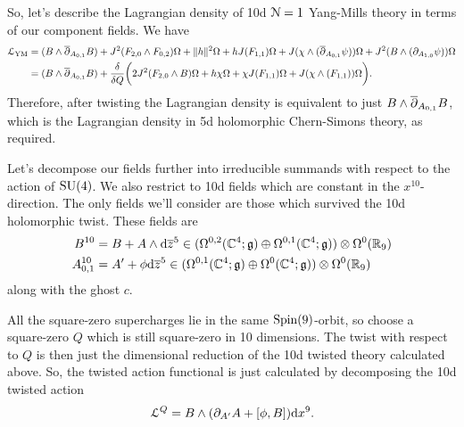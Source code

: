 \documentclass[10pt, oneside]{article}
\renewcommand{\d}{\mathrm{d}}
\begin{document}
\begin{example}[10d $\mc N=1$ Super Yang-Mills]
So, let's describe the Lagrangian density of 10d $\mc N=1$ Yang-Mills theory in terms of our component fields.  We have
\begin{align*}
\mathcal{L}_{\mathrm{YM}} &= (B \wedge \overline{\partial}_{A_{0,1}} B) + J^2(F_{2, 0}\wedge F_{0,2})\Omega + \|h\|^2\Omega + h J(F_{1,1}) \Omega + J( \chi \wedge (\overline{\partial}_{A_{0,1}} \psi)) \Omega + J^2(B \wedge (\partial_{A_{1,0}} \psi)) \Omega \\
&= (B \wedge \overline{\partial}_{A_{0,1}} B) + \frac\delta{\delta Q}\bigg( 2J^2(F_{2, 0}\wedge B)\Omega + h\chi\Omega + \chi J(F_{1,1}) \Omega + J( \chi \wedge (F_{1,1})) \Omega\bigg).
\end{align*}
Therefore, after twisting the Lagrangian density is equivalent to just $B \wedge \overline{\partial}_{A_{0,1}} B$, which is the Lagrangian density in 5d holomorphic Chern-Simons theory, as required.
\end{example}

\begin{example}[9d $\mc N=1$ Super Yang-Mills]
Let's decompose our fields further into irreducible summands with respect to the action of $\mathrm{SU}(4)$.  We also restrict to 10d fields which are constant in the $x^{10}$-direction.  The only fields we'll consider are those which survived the 10d holomorphic twist.  These fields are
\begin{align*}
B^{10} &= B + A \wedge \d \ol z^5 \in (\Omega^{0,2}(\CC^4; \gg) \oplus \Omega^{0,1}(\CC^4; \gg)) \otimes \Omega^0(\RR_9) \\
A^{10}_{0,1} &= A' + \phi \d \ol z^5 \in (\Omega^{0,1}(\CC^4; \gg) \oplus \Omega^0(\CC^4; \gg)) \otimes \Omega^0(\RR_9)
\end{align*}
along with the ghost $c$.

All the square-zero supercharges lie in the same $\mathrm{Spin}(9)$-orbit, so choose a square-zero $Q$ which is still square-zero in 10 dimensions.  The twist with respect to $Q$ is then just the dimensional reduction of the 10d twisted theory calculated above.  So, the twisted action functional is just calculated by decomposing the 10d twisted action
\[\LL^Q = B \wedge (\dd_{A'} A + [\phi, B]) \d x^9.\]
\end{example}
\end{document}
